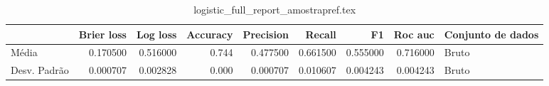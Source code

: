 \begin{table}
\centering
\caption{logistic_full_report_amostrapref.tex}
\label{logistic_full_report_amostrapref.tex}
\begin{tabular}{lrrrrrrrl}
\toprule
{} &  Brier  loss &  Log loss &  Accuracy  &  Precision  &   Recall  &       F1  &  Roc auc  & Conjunto de dados \\
\midrule
Média        &     0.170500 &  0.516000 &      0.744 &    0.477500 &  0.661500 &  0.555000 &  0.716000 &             Bruto \\
Desv. Padrão &     0.000707 &  0.002828 &      0.000 &    0.000707 &  0.010607 &  0.004243 &  0.004243 &             Bruto \\
\bottomrule
\end{tabular}
\end{table}
